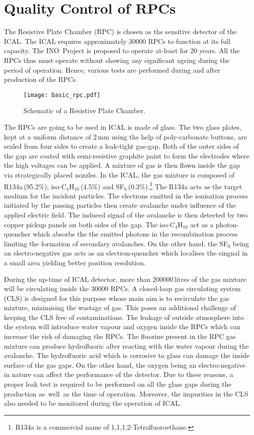 \chapter{Quality Control of RPCs}
The Resistive Plate Chamber (RPC) is chosen as the sensitive detector
of the
ICAL. The ICAL requires approximately 30000 RPCs to function at its full
capacity. The INO~Project is proposed to operate at-least for 20 years. All
the RPCs thus must operate without showing any significant ageing during the
period of operation. Hence, various tests are performed during and after
production of the RPCs.
\begin{figure}[h]
  \centering
  \texttt{[image: basic\_rpc.pdf]}
  \caption{Schematic of a Resistive Plate Chamber.}
  \label{fig:rpc}
\end{figure}

The RPCs are going to be used in ICAL is made of glass. The two glass plates,
kept at a uniform distance of 2\,mm using the help of poly-carbonate buttons,
are sealed from four sides to create a leak-tight gas-gap. Both of the outer
sides of the gap are coated with semi-resistive graphite paint to form the
electrodes where the high voltages can be applied. A mixture of gas is then
flown inside the gap via strategically placed nozzles. In the ICAL, the gas
mixture is composed of R134a\,(95.2\%), iso-C$_4$H$_{10}$\,(4.5\%) and
SF$_6$\,(0.3\%).\footnote{R134a is a commercial name of 1,1,1,2-Tetrafluoroethane.}
The R134a acts as the target medium for the incident particles. The electrons
emitted in the ionisation process initiated by the passing particles then
create avalanche under influence of the applied electric field. The induced
signal of the avalanche is then detected by two copper pickup panels on both
sides of the gap. The iso-C$_4$H$_{10}$ act as a photon-quencher which absorbs
the the emitted photons in the recombination process limiting the formation of
secondary avalanches. On the other hand, the SF$_6$ being an electro-negative
gas acts as an electron-quencher which localises the singnal in a small area
yielding better position resolution.

During the up-time of ICAL detector, more than 200000\,litres of the gas
mixture will be circulating inside the 30000 RPCs. A closed-loop gas
circulating system (CLS) is designed for this purpose whose main aim is to
recirculate the gas mixture, minimising the wastage of gas. This poses an
additional challenge of keeping the CLS free of contaminations. The leakage of
outside atmosphere into the system will introduce water vapour and oxygen
inside the RPCs which can increase the risk of damaging the
RPCs\cite{rpc_c,rpc_w}. The fluorine present in the RPC gas mixture can
produce hydrofluoric after reacting with the water vapour during the avalanche.
The hydrofluoric acid which is corrosive to glass can damage the inside surface
of the gas gaps. On the other hand, the oxygen being an electro-negative in
nature can affect the performance of the detector. Due to these reasons, a
proper leak test is required to be performed on all the glass gaps during the
production as~well~as the time of operation. Moreover, the impurities in the
CLS also needed to be monitored during the operation of ICAL.


